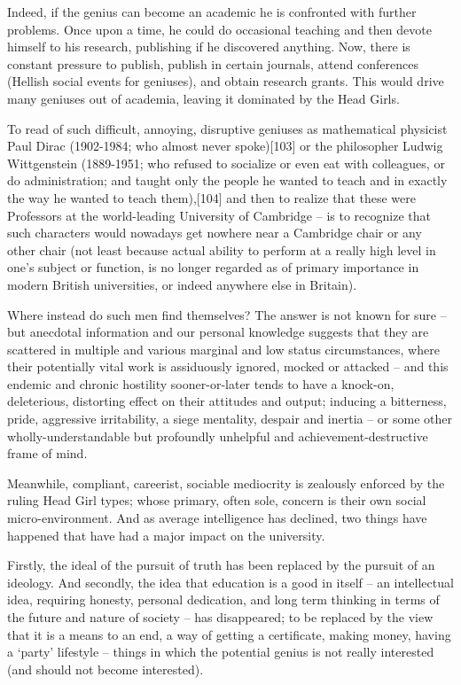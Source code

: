 \documentclass[
]{book}
\begin{document}
Indeed, if the genius can become an academic he is confronted with further problems. Once upon a time, he could do occasional teaching and then devote himself to his research, publishing if he discovered anything. Now, there is constant pressure to publish, publish in certain journals, attend conferences (Hellish social events for geniuses), and obtain research grants. This would drive many geniuses out of academia, leaving it dominated by the Head Girls.

To read of such difficult, annoying, disruptive geniuses as mathematical physicist Paul Dirac (1902-1984; who almost never spoke){[}103{]} or the philosopher Ludwig Wittgenstein (1889-1951; who refused to socialize or even eat with colleagues, or do administration; and taught only the people he wanted to teach and in exactly the way he wanted to teach them),{[}104{]} and then to realize that these were Professors at the world-leading University of Cambridge -- is to recognize that such characters would nowadays get nowhere near a Cambridge chair or any other chair (not least because actual ability to perform at a really high level in one's subject or function, is no longer regarded as of primary importance in modern British universities, or indeed anywhere else in Britain).

Where instead do such men find themselves? The answer is not known for sure -- but anecdotal information and our personal knowledge suggests that they are scattered in multiple and various marginal and low status circumstances, where their potentially vital work is assiduously ignored, mocked or attacked -- and this endemic and chronic hostility sooner-or-later tends to have a knock-on, deleterious, distorting effect on their attitudes and output; inducing a bitterness, pride, aggressive irritability, a siege mentality, despair and inertia -- or some other wholly-understandable but profoundly unhelpful and achievement-destructive frame of mind.

Meanwhile, compliant, careerist, sociable mediocrity is zealously enforced by the ruling Head Girl types; whose primary, often sole, concern is their own social micro-environment. And as average intelligence has declined, two things have happened that have had a major impact on the university.

Firstly, the ideal of the pursuit of truth has been replaced by the pursuit of an ideology. And secondly, the idea that education is a good in itself -- an intellectual idea, requiring honesty, personal dedication, and long term thinking in terms of the future and nature of society -- has disappeared; to be replaced by the view that it is a means to an end, a way of getting a certificate, making money, having a `party' lifestyle -- things in which the potential genius is not really interested (and should not become interested).
\end{document}
